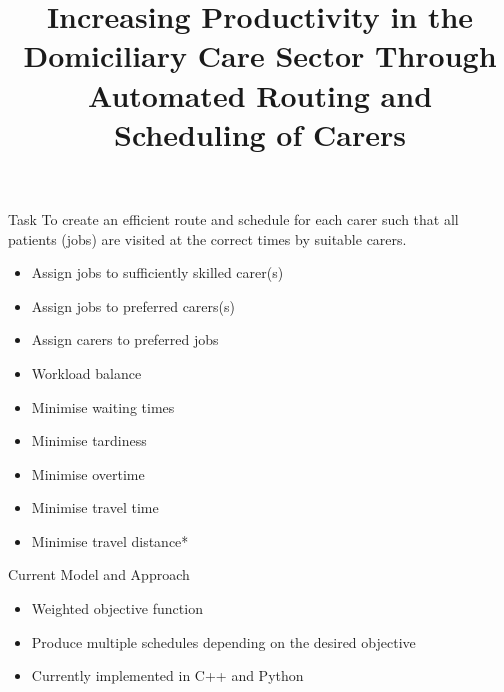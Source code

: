 \documentclass[usenames,dvipsnames]{beamer}
\begin{document}
\title{Increasing Productivity in the Domiciliary Care Sector Through Automated Routing and Scheduling of Carers}
\date{}
\maketitle


\begin{frame}{Task}
To create an efficient route and schedule for each carer such that all patients (jobs) are visited at the correct times by suitable carers.
\small
\begin{multicols}{2}
	\begin{itemize}
		\item Assign jobs to sufficiently skilled carer(s)
		\item Assign jobs to preferred carers(s)
		\item Assign carers to preferred jobs
		\item Workload balance %
		\item Minimise waiting times %
		\item Minimise tardiness %
		\item Minimise overtime %
		\item Minimise travel time %
		\item Minimise travel distance*
	\end{itemize}	
\end{multicols}	
\end{frame}	

\begin{frame}{Current Model and Approach}
	\begin{itemize}
		\item Weighted objective function 
		\item Produce multiple schedules depending on the desired objective
		\item Currently implemented in C++ and Python
	\end{itemize}	
\end{frame}
\end{document}
